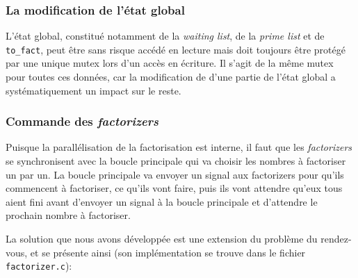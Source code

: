 \documentclass[a4paper,10pt]{article}
\begin{document}
\subsubsection*{La modification de l'état global}

L'état global, constitué notamment de la \emph{waiting list}, de la \emph{prime list} et de \texttt{to\_fact}, peut être sans risque accédé en lecture mais doit toujours être protégé par une unique mutex lors d'un accès en écriture. Il s'agit de la même mutex pour toutes ces données, car la modification de d'une partie de l'état global a systématiquement un impact sur le reste.

\subsubsection*{Commande des \emph{factorizers}}

Puisque la parallélisation de la factorisation est interne, il faut que les \emph{factorizers} se synchronisent avec la boucle principale qui va choisir les nombres à factoriser un par un. La boucle principale va envoyer un signal aux factorizers pour qu'ils commencent à factoriser, ce qu'ils vont faire, puis ils vont attendre qu'eux tous aient fini avant d'envoyer un signal à la boucle principale et d'attendre le prochain nombre à factoriser.

La solution que nous avons développée est une extension du problème du rendez-vous, et se présente ainsi (son implémentation se trouve dans le fichier \texttt{factorizer.c}):

\end{document}
